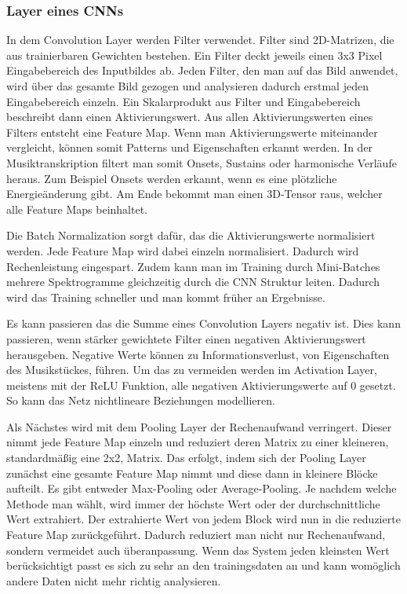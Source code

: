\subsubsection*{Layer eines CNNs}
In dem Convolution Layer werden Filter verwendet.
Filter sind 2D-Matrizen, die aus trainierbaren Gewichten bestehen.
Ein Filter deckt jeweils einen 3x3 Pixel Eingabebereich des Inputbildes ab.
Jeden Filter, den man auf das Bild anwendet,
wird über das gesamte Bild gezogen und analysieren dadurch erstmal jeden Eingabebereich einzeln.
Ein Skalarprodukt aus Filter und Eingabebereich beschreibt dann einen Aktivierungswert.
Aus allen Aktivierungswerten eines Filters entsteht eine Feature Map.
Wenn man Aktivierungswerte miteinander vergleicht,
können somit Patterns und Eigenschaften erkannt werden.
In der Musiktranskription filtert man somit Onsets, Sustains oder harmonische Verläufe heraus.
Zum Beispiel Onsets werden erkannt, wenn es eine plötzliche Energieänderung gibt.
Am Ende bekommt man einen 3D-Tensor raus, welcher alle Feature Maps beinhaltet.

Die Batch Normalization sorgt dafür, das die Aktivierungswerte normalisiert werden.
Jede Feature Map wird dabei einzeln normalisiert.
Dadurch wird Rechenleistung eingespart.
Zudem kann man im Training durch Mini-Batches mehrere Spektrogramme gleichzeitig durch die CNN Struktur leiten.
Dadurch wird das Training schneller und man kommt früher an Ergebnisse.

Es kann passieren das die Summe eines Convolution Layers negativ ist.
Dies kann passieren, wenn stärker gewichtete Filter einen negativen Aktivierungswert herausgeben.
Negative Werte können zu Informationsverlust, von Eigenschaften des Musikstückes, führen.
Um das zu vermeiden werden im Activation Layer, meistens mit der ReLU Funktion,
alle negativen Aktivierungswerte auf 0 gesetzt.
So kann das Netz nichtlineare Beziehungen modellieren.

Als Nächstes wird mit dem Pooling Layer der Rechenaufwand verringert.
Dieser nimmt jede Feature Map einzeln und reduziert deren Matrix zu einer kleineren, standardmäßig eine 2x2, Matrix.
Das erfolgt, indem sich der Pooling Layer zunächst eine
gesamte Feature Map nimmt und diese dann in kleinere Blöcke aufteilt.
Es gibt entweder Max-Pooling oder Average-Pooling.
Je nachdem welche Methode man wählt, wird immer der höchste Wert oder der durchschnittliche Wert extrahiert.
Der extrahierte Wert von jedem Block wird nun in die reduzierte Feature Map zurückgeführt.
Dadurch reduziert man nicht nur Rechenaufwand, sondern vermeidet auch überanpassung.
Wenn das System jeden kleinsten Wert berücksichtigt passt es sich zu sehr an den trainingsdaten an
und kann womöglich andere Daten nicht mehr richtig analysieren.


